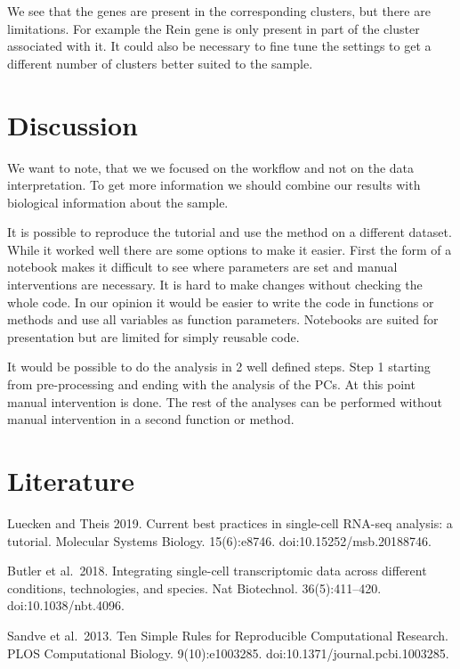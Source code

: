 \documentclass[a4paper, 10pt]{scrartcl}
\begin{document}
We see that the genes are present in the corresponding clusters, but
there are limitations. For example the Rein gene is only present in part
of the cluster associated with it. It could also be necessary to fine
tune the settings to get a different number of clusters better suited to
the sample.

\hypertarget{discussion}{%
\section{Discussion}\label{discussion}}

We want to note, that we we focused on the workflow and not on the data
interpretation. To get more information we should combine our results
with biological information about the sample.

It is possible to reproduce the tutorial and use the method on a
different dataset. While it worked well there are some options to make
it easier. First the form of a notebook makes it difficult to see where
parameters are set and manual interventions are necessary. It is hard to
make changes without checking the whole code. In our opinion it would be
easier to write the code in functions or methods and use all variables
as function parameters. Notebooks are suited for presentation but are
limited for simply reusable code.

It would be possible to do the analysis in 2 well defined steps. Step 1
starting from pre-processing and ending with the analysis of the PCs. At
this point manual intervention is done. The rest of the analyses can be
performed without manual intervention in a second function or method.

\hypertarget{literature}{%
\section*{Literature}\label{literature}}

Luecken and Theis 2019. Current best practices in single-cell RNA-seq
analysis: a tutorial. Molecular Systems Biology. 15(6):e8746.
doi:10.15252/msb.20188746.

Butler et al.~2018. Integrating single-cell transcriptomic data across
different conditions, technologies, and species. Nat Biotechnol.
36(5):411--420. doi:10.1038/nbt.4096.

Sandve et al.~2013. Ten Simple Rules for Reproducible Computational
Research. PLOS Computational Biology. 9(10):e1003285.
doi:10.1371/journal.pcbi.1003285.
\end{document}
